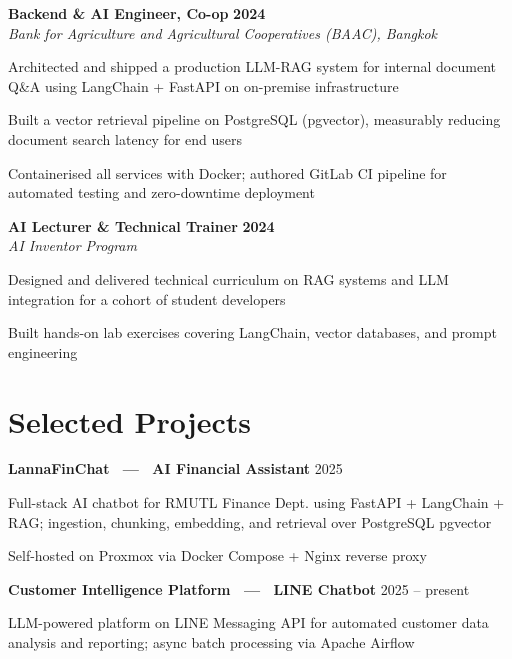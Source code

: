 \documentclass[10pt,a4paper]{article}
\newcommand{\entryhead}[3]{%
  {\bfseries\color{cvdark}#1}\hfill
  {\small\bfseries\color{cvblue}#3}\\[-2pt]
  {\small\color{cvgray}\textit{#2}}\vspace{4pt}%
}
\newcommand{\projecthead}[2]{%
  {\bfseries\color{cvdark}#1}\hfill
  {\small\color{cvgray}#2}\vspace{4pt}%
}
\begin{document}
\vspace{7pt}
\entryhead{Backend \& AI Engineer, Co-op}
          {Bank for Agriculture and Agricultural Cooperatives (BAAC), Bangkok}{2024}
\begin{cvlist}
  \item Architected and shipped a production LLM-RAG system for internal document Q\&A
        using LangChain + FastAPI on on-premise infrastructure
  \item Built a vector retrieval pipeline on PostgreSQL (pgvector), measurably reducing
        document search latency for end users
  \item Containerised all services with Docker; authored GitLab CI pipeline for
        automated testing and zero-downtime deployment
\end{cvlist}

\vspace{7pt}
\entryhead{AI Lecturer \& Technical Trainer}
          {AI Inventor Program}{2024}
\begin{cvlist}
  \item Designed and delivered technical curriculum on RAG systems and LLM integration
        for a cohort of student developers
  \item Built hands-on lab exercises covering LangChain, vector databases, and
        prompt engineering
\end{cvlist}

\section{Selected Projects}

\projecthead{LannaFinChat \ --- \ AI Financial Assistant}{2025}
\begin{cvlist}
  \item Full-stack AI chatbot for RMUTL Finance Dept. using FastAPI + LangChain + RAG;
        ingestion, chunking, embedding, and retrieval over PostgreSQL pgvector
  \item Self-hosted on Proxmox via Docker Compose + Nginx reverse proxy
\end{cvlist}

\vspace{5pt}
\projecthead{Customer Intelligence Platform \ --- \ LINE Chatbot}{2025 -- present}
\begin{cvlist}
  \item LLM-powered platform on LINE Messaging API for automated customer data analysis
        and reporting; async batch processing via Apache Airflow
\end{cvlist}
\end{document}
